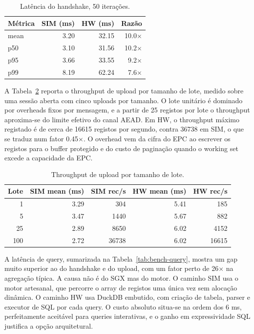 \begin{table}[H]
\centering
\small
\begin{tabular}{lrrr}
\toprule
Métrica & SIM (ms) & HW (ms) & Razão \\
\midrule
mean & 3.20  & 32.15 & 10.0$\times$ \\
p50  & 3.10  & 31.56 & 10.2$\times$ \\
p95  & 3.66  & 33.55 &  9.2$\times$ \\
p99  & 8.19  & 62.24 &  7.6$\times$ \\
\bottomrule
\end{tabular}
\caption{Latência do handshake, 50 iterações.}
\label{tab:bench-handshake}
\end{table}

A Tabela~\ref{tab:bench-upload} reporta o throughput de upload por tamanho de lote, medido sobre uma sessão aberta com cinco uploads por tamanho. O lote unitário é dominado por overheads fixos por mensagem, e a partir de 25 registos por lote o throughput aproxima-se do limite efetivo do canal AEAD. Em HW, o throughput máximo registado é de cerca de 16615 registos por segundo, contra 36738 em SIM, o que se traduz num fator 0.45$\times$. O overhead vem da cifra do EPC ao escrever os registos para o buffer protegido e do custo de paginação quando o working set excede a capacidade da EPC.

\begin{table}[H]
\centering
\small
\begin{tabular}{rrrrr}
\toprule
Lote & SIM mean (ms) & SIM rec/s & HW mean (ms) & HW rec/s \\
\midrule
1   & 3.29 & 304   & 5.41 & 185   \\
5   & 3.47 & 1440  & 5.67 & 882   \\
25  & 2.89 & 8650  & 6.02 & 4152  \\
100 & 2.72 & 36738 & 6.02 & 16615 \\
\bottomrule
\end{tabular}
\caption{Throughput de upload por tamanho de lote.}
\label{tab:bench-upload}
\end{table}

A latência de query, sumarizada na Tabela~\ref{tab:bench-query}, mostra um gap muito superior ao do handshake e do upload, com um fator perto de 26$\times$ na agregação típica. A causa não é do SGX mas do motor. O caminho SIM usa o motor artesanal, que percorre o array de registos uma única vez sem alocação dinâmica. O caminho HW usa DuckDB embutido, com criação de tabela, parser e executor de SQL por cada query. O custo absoluto situa-se na ordem dos 6 ms, perfeitamente aceitável para queries interativas, e o ganho em expressividade SQL justifica a opção arquitetural.

